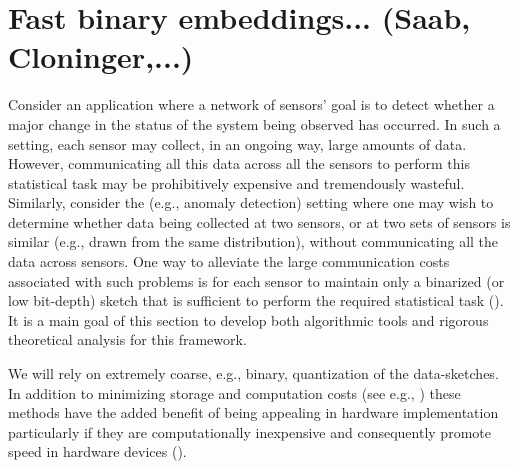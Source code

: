 \section{Fast binary embeddings... (Saab, Cloninger,...)}

Consider an application where a network of sensors' goal is to detect whether a major change in the status of the system being observed has occurred. In such a setting, each sensor may collect, in an ongoing way, large amounts of data. However, communicating all this data across all the sensors to perform this statistical task may be prohibitively expensive and tremendously wasteful. Similarly, consider the (e.g., anomaly detection) setting where one may wish to determine whether data being collected at two sensors, or at two sets of sensors is similar (e.g., drawn from the same distribution), without communicating all the data across sensors. One way to alleviate the large communication costs associated with such problems is for each sensor to maintain only a binarized (or low bit-depth) sketch that is sufficient to perform the required statistical task (\cite{Gribonval, Jacques}). It is a main goal of this section to develop both algorithmic tools and rigorous theoretical analysis for this framework. 

We will rely on extremely
coarse, e.g., binary, quantization of the data-sketches. In addition to minimizing storage and computation costs (see e.g., \cite{fang2014sparse,boufounos20081}) these methods have the added benefit of being appealing in hardware implementation particularly if they are computationally inexpensive and consequently promote speed in hardware devices (\cite{jacques2013robust,le2005analog}). %
